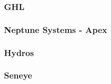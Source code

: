         \subsubsection{GHL}
        \subsubsection{Neptune Systems - Apex}
        \subsubsection{Hydros}
        \subsubsection{Seneye}


        